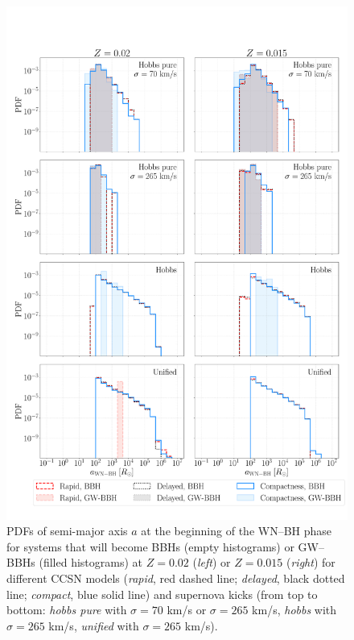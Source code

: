 \documentclass[a4paper,titlepage]{book}     	%
\begin{document}
\begin{appendices}
\begin{figure}
	\centering
	\includegraphics[width=\textwidth]{./images/WRBH-anonpureHe.pdf}	
	\caption{PDFs of semi-major axis $a$ at the beginning of the WN--BH phase for systems that will become BBHs (empty histograms) or GW--BBHs (filled histograms) at $Z=0.02$ (\emph{left}) or $Z=0.015$ (\emph{right}) for different CCSN models (\emph{rapid}, red dashed line; \emph{delayed}, black dotted line; \emph{compact}, blue solid line) and supernova kicks (from top to bottom: \emph{hobbs pure} with $\sigma = 70$ km/s or $\sigma = 265$ km/s, \emph{hobbs} with $\sigma = 265$ km/s, \emph{unified} with $\sigma = 265$ km/s).}\label{fig:resultsWRBH-anonpureHe}
\end{figure}


\end{appendices}
\end{document}
